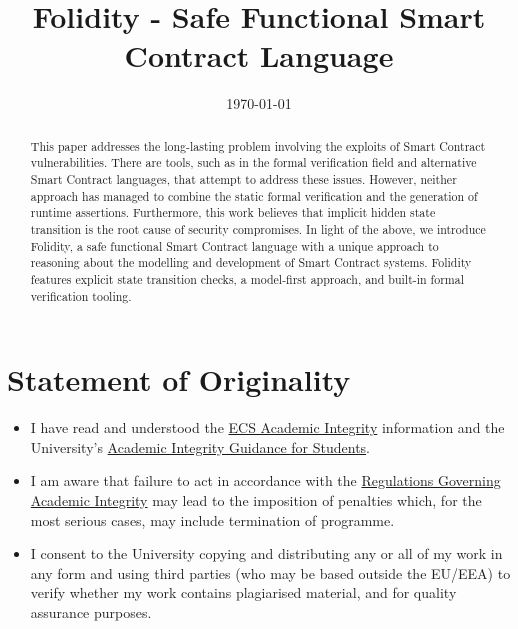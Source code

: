 \documentclass[oneside]{ecsproject}     %
\begin{document}
\frontmatter
\title      {Folidity - Safe Functional Smart Contract Language}
\addresses  {\groupname\\\deptname\\\univname}
\date       {\today}
\subject    {}
\keywords   {}
\maketitle

\begin{abstract}
  This paper addresses the long-lasting problem involving the exploits of Smart Contract vulnerabilities.
  There are tools, such as in the formal verification field and alternative Smart Contract languages, that
  attempt to address these issues. However, neither approach has managed to combine
  the static formal verification and the generation of runtime assertions. 
  Furthermore, this work believes that implicit hidden state transition is the root cause
  of security compromises. In light of the above, we introduce Folidity, a safe functional Smart Contract language
  with a unique approach to reasoning about the modelling and development of Smart Contract systems.
  Folidity features explicit state transition checks, a model-first approach, and built-in formal verification
  tooling.
\end{abstract}

\chapter{Statement of Originality}
\small
\begin{itemize}
    \item I have read and understood the \href{http://ecs.gg/ai}{ECS Academic Integrity} information and the University’s \href{https://www.southampton.ac.uk/quality/assessment/academic_integrity.page}{Academic Integrity Guidance for Students}.
    
    \item I am aware that failure to act in accordance with the \href{http://www.calendar.soton.ac.uk/sectionIV/academic-integrity-regs.html}{Regulations Governing Academic Integrity} may lead to the imposition of penalties which, for the most serious cases, may include termination of programme.

    \item I consent to the University copying and distributing any or all of my work in any form and using third parties (who may be based outside the EU/EEA) to verify whether my work contains plagiarised material, and for quality assurance purposes.
\end{itemize}
\end{document}
